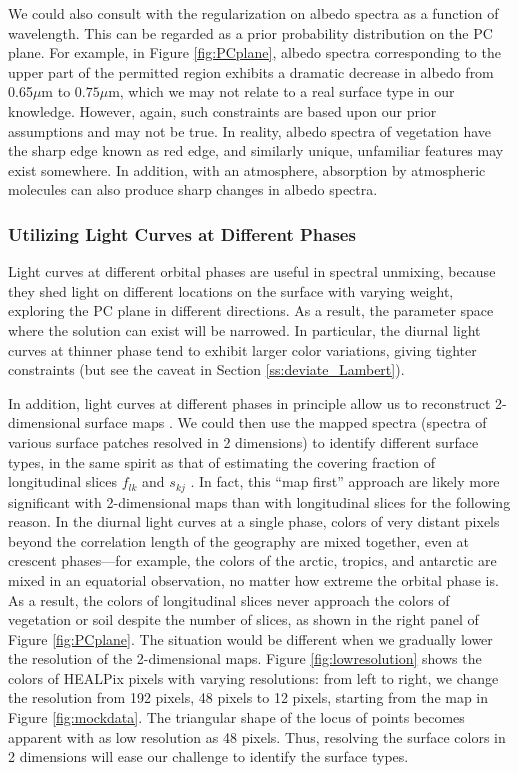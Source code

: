 \documentclass[iop,numberedappendix,apj,]{emulateapj}
\begin{document}
We could also consult with the regularization on albedo spectra as a function of wavelength. 
This can be regarded as a prior probability distribution on the PC plane. 
For example, in Figure \ref{fig:PCplane}, albedo spectra corresponding to the upper part of the permitted region exhibits a dramatic decrease in albedo from 0.65$\mu $m to $0.75\mu $m, which we may not relate to a real surface type in our knowledge. 
However, again, such constraints are based upon our prior assumptions and may not be true. 
In reality, albedo spectra of vegetation have the sharp edge known as red edge, and similarly unique, unfamiliar features may exist somewhere. 
In addition, with an atmosphere, absorption by atmospheric molecules can also produce sharp changes in albedo spectra. 


\subsubsection{Utilizing Light Curves at Different Phases}

Light curves at different orbital phases are useful in spectral unmixing, because they shed light on different locations on the surface with varying weight, exploring the PC plane in different directions. 
As a result, the parameter space where the solution can exist will be narrowed.  
In particular, the diurnal light curves at thinner phase tend to exhibit larger color variations, giving tighter constraints (but see the caveat in Section \ref{ss:deviate_Lambert}). 

In addition, light curves at different phases in principle allow us to reconstruct 2-dimensional surface maps  \citep{Kawahara2010,Kawahara2011,Fujii2012}. 
We could then use the mapped spectra (spectra of various surface patches resolved in 2 dimensions) to identify different surface types, in the same spirit as that of estimating the covering fraction of longitudinal slices $f_{lk}$ and $s_{kj}$ . 
In fact, this ``map first'' approach are likely more significant with 2-dimensional maps than with longitudinal slices for the following reason. 
In the diurnal light curves at a single phase, colors of very distant pixels beyond the correlation length of the geography are mixed together, even at crescent phases---for example, the colors of the arctic, tropics, and antarctic are mixed in an equatorial observation, no matter how extreme the orbital phase is. 
As a result, the colors of longitudinal slices never approach the colors of vegetation or soil despite the number of slices, as shown in the right panel of Figure \ref{fig:PCplane}. 
The situation would be different when we gradually lower the resolution of the 2-dimensional maps. 
Figure \ref{fig:lowresolution} shows the colors of HEALPix pixels \citep{Gorski2005} with varying resolutions: from left to right, we change the resolution from 192 pixels, 48 pixels to 12 pixels, starting from the map in Figure \ref{fig:mockdata}. 
The triangular shape of the locus of points becomes apparent with as low resolution as 48 pixels. 
Thus, resolving the surface colors in 2 dimensions will ease our challenge to identify the surface types. 
\end{document}
